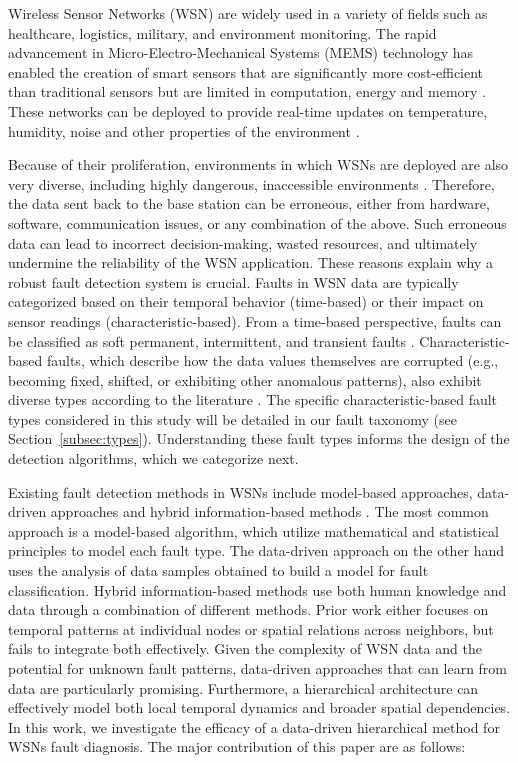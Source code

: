 Wireless Sensor Networks (WSN) are widely used in a variety of fields such as healthcare, logistics, military, and environment monitoring. The rapid advancement in Micro-Electro-Mechanical Systems (MEMS) technology has enabled the creation of smart sensors that are significantly more cost-efficient than traditional sensors but are limited in computation, energy and memory \cite{Yick2008, Chai2020, Hussain2021}. These networks can be deployed to provide real-time updates on temperature, humidity, noise and other properties of the environment \cite{Yick2008, Chai2020, Ullo2020}.

Because of their proliferation, environments in which WSNs are deployed are also very diverse, including highly dangerous, inaccessible environments \cite{Prasad2023}. Therefore, the data sent back to the base station can be erroneous, either from hardware, software, communication issues, or any combination of the above. Such erroneous data can lead to incorrect decision-making, wasted resources, and ultimately undermine the reliability of the WSN application. These reasons explain why a robust fault detection system is crucial. Faults in WSN data are typically categorized based on their temporal behavior (time-based) or their impact on sensor readings (characteristic-based). From a time-based perspective, faults can be classified as soft permanent, intermittent, and transient faults \cite{Prasad2023}. Characteristic-based faults, which describe how the data values themselves are corrupted (e.g., becoming fixed, shifted, or exhibiting other anomalous patterns), also exhibit diverse types according to the literature \cite{Shi2024, Saeed2021, Ni2009, Hasan2024}. The specific characteristic-based fault types considered in this study will be detailed in our fault taxonomy (see Section~\ref{subsec:types}). Understanding these fault types informs the design of the detection algorithms, which we categorize next.

Existing fault detection methods in WSNs include model-based approaches, data-driven approaches and hybrid information-based methods \cite{Shi2024}. The most common approach is a model-based algorithm, which utilize mathematical and statistical principles to model each fault type. The data-driven approach on the other hand uses the analysis of data samples obtained to build a model for fault classification. Hybrid information-based methods use both human knowledge and data through a combination of different methods. Prior work either focuses on temporal patterns at individual nodes or spatial relations across neighbors, but fails to integrate both effectively. Given the complexity of WSN data and the potential for unknown fault patterns, data-driven approaches that can learn from data are particularly promising. Furthermore, a hierarchical architecture can effectively model both local temporal dynamics and broader spatial dependencies. In this work, we investigate the efficacy of a data-driven hierarchical method for WSNs fault diagnosis. The major contribution of this paper are as follows:


